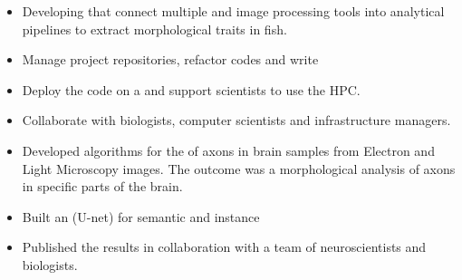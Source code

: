 \documentclass[10pt,a4paper,ragged2e,withhyper]{altacv}
\begin{document}
\begin{paracol}{2}
        \newpage
        
        
        \switchcolumn

        
            \begin{itemize}
                \item Developing  that connect multiple  and image processing tools into analytical pipelines to extract morphological traits in fish.
                \item Manage  project repositories, refactor codes and write 
                \item Deploy the code on a  and support scientists to use the HPC.
                \item Collaborate with biologists, computer scientists and infrastructure managers.
            \end{itemize}
            \divider
            
            \begin{itemize}
                \item Developed algorithms for the  of axons in brain samples from Electron and Light Microscopy images. The outcome was a morphological analysis of axons in specific parts of the brain.
                \item Built an  (U-net) for semantic and instance 
                \item Published the results in collaboration with a team of neuroscientists and biologists.
            \end{itemize}
            \divider            
            \begin{itemize}
            

\end{itemize}
\end{paracol}
\end{document}
